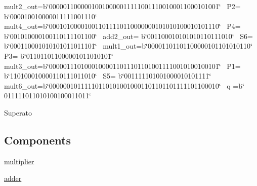 mult2\+\_\+out=b\char`\"{}000001100000100100000111110011100100011000101001\char`\"{}~\newline
 P2= b\char`\"{}000010010000011111001110\char`\"{}~\newline
 mult4\+\_\+out=b\char`\"{}000101000010011011110110000000101010100010101110\char`\"{}~\newline
 P4= b\char`\"{}001010000100110111101100\char`\"{}~\newline
 add2\+\_\+out= b\char`\"{}001100010101010110111010\char`\"{}~\newline
 S6= b\char`\"{}000110001010101011011101\char`\"{}~\newline
 mult1\+\_\+out=b\char`\"{}00001101101100000101101010110\char`\"{}~\newline
 P3= b\char`\"{}011011011000001011010101\char`\"{}~\newline
 mult3\+\_\+out=b\char`\"{}000001110100010000110111011010011110010100100101\char`\"{}~\newline
 P1= b\char`\"{}110100010000110111011010\char`\"{}~\newline
 S5= b\char`\"{}001111101001000010101111\char`\"{}~\newline
 mult6\+\_\+out=b\char`\"{}000000101111101101010010001101101101111101100010\char`\"{}~\newline
 q =b\char`\"{}       011111011010100100011011\char`\"{}  

Superato   


\subsection*{Components}
 \begin{DoxyCompactItemize}
\item 
\hyperlink{group___linear_regression_ga3cf9cbfc3e637ae0660c32ceef50386f}{multiplier}  {\bfseries }  
\item 
\hyperlink{group___linear_regression_ga9d7a8a381439c61aea549e7a47ec7a6f}{adder}  {\bfseries }  
\end{DoxyCompactItemize}
